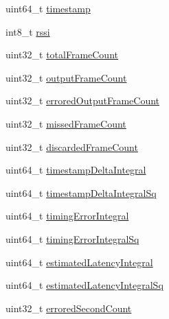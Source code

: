 \begin{DoxyCompactItemize}
\item 
uint64\+\_\+t \hyperlink{struct_a_r_s_t_r_e_a_m2___stream_stats___video_stats__t_ad561fd346100cc63d38ae11a7ddd4d0f}{timestamp}
\item 
int8\+\_\+t \hyperlink{struct_a_r_s_t_r_e_a_m2___stream_stats___video_stats__t_a13e6ada1f57e75b95f48df0f8dab73ad}{rssi}
\item 
uint32\+\_\+t \hyperlink{struct_a_r_s_t_r_e_a_m2___stream_stats___video_stats__t_a80c9e29d4ca781fa588982e117241012}{total\+Frame\+Count}
\item 
uint32\+\_\+t \hyperlink{struct_a_r_s_t_r_e_a_m2___stream_stats___video_stats__t_abe16f5d98493f0e57a7de6231aa9dcb4}{output\+Frame\+Count}
\item 
uint32\+\_\+t \hyperlink{struct_a_r_s_t_r_e_a_m2___stream_stats___video_stats__t_ab239163a6a192cdd2f782ad0900bb7c4}{errored\+Output\+Frame\+Count}
\item 
uint32\+\_\+t \hyperlink{struct_a_r_s_t_r_e_a_m2___stream_stats___video_stats__t_a386994df208e86a84dde44c02449e186}{missed\+Frame\+Count}
\item 
uint32\+\_\+t \hyperlink{struct_a_r_s_t_r_e_a_m2___stream_stats___video_stats__t_a06a2fb8980eb2e74d1a38cc8251bd72e}{discarded\+Frame\+Count}
\item 
uint64\+\_\+t \hyperlink{struct_a_r_s_t_r_e_a_m2___stream_stats___video_stats__t_a645905f6f15b64a99911fa2a96a80434}{timestamp\+Delta\+Integral}
\item 
uint64\+\_\+t \hyperlink{struct_a_r_s_t_r_e_a_m2___stream_stats___video_stats__t_a42bc915403bd2e81c91fae6661c100f4}{timestamp\+Delta\+Integral\+Sq}
\item 
uint64\+\_\+t \hyperlink{struct_a_r_s_t_r_e_a_m2___stream_stats___video_stats__t_ae89509eee09abeb406dd2cd58ed6d56e}{timing\+Error\+Integral}
\item 
uint64\+\_\+t \hyperlink{struct_a_r_s_t_r_e_a_m2___stream_stats___video_stats__t_ab7cfe2dc93ec647c2a9e939d68f35144}{timing\+Error\+Integral\+Sq}
\item 
uint64\+\_\+t \hyperlink{struct_a_r_s_t_r_e_a_m2___stream_stats___video_stats__t_aef8945662b86e0c75a22c31b641c8be0}{estimated\+Latency\+Integral}
\item 
uint64\+\_\+t \hyperlink{struct_a_r_s_t_r_e_a_m2___stream_stats___video_stats__t_a8364bbbae42abe35ca544b3a71e7a784}{estimated\+Latency\+Integral\+Sq}
\item 
uint32\+\_\+t \hyperlink{struct_a_r_s_t_r_e_a_m2___stream_stats___video_stats__t_a2cdd8b1909dabbed53b1e21c65e43ba1}{errored\+Second\+Count}

\end{DoxyCompactItemize}
